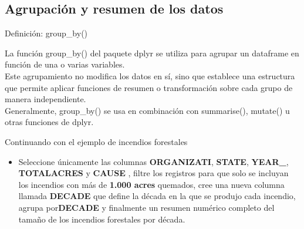 \documentclass[
]{book}
\providecommand{\tightlist}{%
  \setlength{\itemsep}{0pt}\setlength{\parskip}{0pt}}
\begin{document}
\subsection{Agrupación y resumen de los datos}\label{agrupaciuxf3n-y-resumen-de-los-datos}

{} Definición: group\_by()

La función group\_by() del paquete dplyr se utiliza para
agrupar un dataframe en función de una o varias variables.\\
Este agrupamiento no modifica los datos en sí, sino que establece una estructura que permite
aplicar funciones de resumen o transformación sobre cada grupo de manera independiente.\\
Generalmente, group\_by() se usa en combinación con summarise(),
mutate() u otras funciones de dplyr.

Continuando con el ejemplo de incendios forestales

\begin{itemize}
\tightlist
\item
  Seleccione únicamente las columnas \textbf{ORGANIZATI}, \textbf{STATE}, \textbf{YEAR\_}, \textbf{TOTALACRES} y \textbf{CAUSE} , filtre los registros para que solo se incluyan los incendios con más de \textbf{1.000 acres} quemados, cree una nueva columna llamada \textbf{DECADE} que define la década en la que se produjo cada incendio, agrupa por\textbf{DECADE} y finalmente un resumen numérico completo del tamaño de los incendios forestales por década.
\end{itemize}
\end{document}
